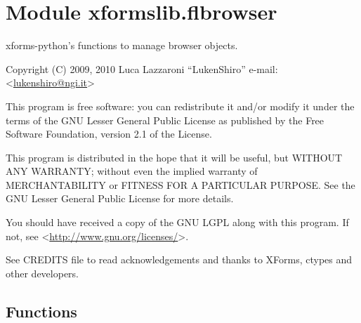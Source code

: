 %
%
%


\section{Module xformslib.flbrowser}

    \label{xformslib:flbrowser}

xforms-python's functions to manage browser objects.

Copyright (C) 2009, 2010  Luca Lazzaroni ``LukenShiro''
e-mail:  <\href{mailto:lukenshiro@ngi.it}{lukenshiro@ngi.it}>

This program is free software: you can redistribute it and/or modify
it under the terms of the GNU Lesser General Public License as
published by the Free Software Foundation, version 2.1 of the License.

This program is distributed in the hope that it will be useful,
but WITHOUT ANY WARRANTY; without even the implied warranty of
MERCHANTABILITY or FITNESS FOR A PARTICULAR PURPOSE. See the
GNU Lesser General Public License for more details.

You should have received a copy of the GNU LGPL along with this
program. If not, see <\href{http://www.gnu.org/licenses/}{http://www.gnu.org/licenses/}>.

See CREDITS file to read acknowledgements and thanks to XForms,
ctypes and other developers.


  \subsection{Functions}

    \label{xformslib:flbrowser:fl_add_browser}

